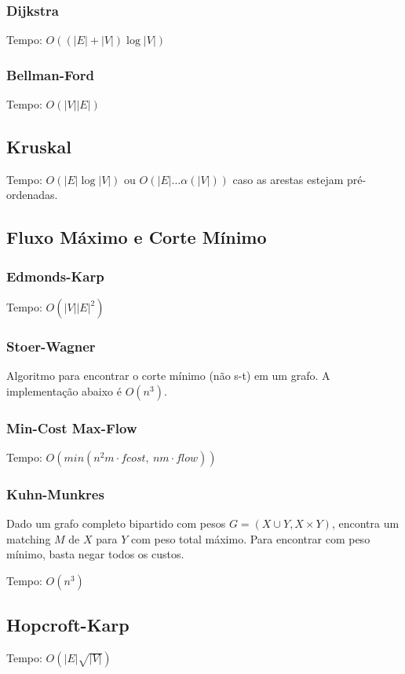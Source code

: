 \documentclass[12pt,a4paper]{article}
\begin{document}
			\subsubsection{Dijkstra}
				Tempo: \( O((|E| + |V|) \log |V|) \)
				
			\subsubsection{Bellman-Ford}
				Tempo: \( O(|V| |E|) \)
				
		\subsection{Kruskal}
			Tempo: \( O(|E| \log |V|) \) ou \( O(|E| \ldots \alpha(|V|)) \) caso as arestas estejam pré-ordenadas.
			
		\subsection{Fluxo Máximo e Corte Mínimo}
			\subsubsection{Edmonds-Karp}
				Tempo: \( O(|V| |E|^2) \)
				
			\subsubsection{Stoer-Wagner}
				Algoritmo para encontrar o corte mínimo (não s-t) em um grafo. A implementação abaixo é \(O(n^3)\).
				
			\subsubsection{Min-Cost Max-Flow}
				Tempo: \( O(min(n^2 m \cdot fcost, ~ n m \cdot flow) ) \)
				
			\subsubsection{Kuhn-Munkres}
				Dado um grafo completo bipartido com pesos $ G = (X \cup Y, X \times Y) $, encontra um matching $M$ de $X$ para $Y$ com peso total máximo. Para encontrar com peso mínimo, basta negar todos os custos.

				Tempo: \( O(n^3) \)
				
		\subsection{Hopcroft-Karp}
			Tempo: \( O(|E| \sqrt{|V|})\)
			
\end{document}

